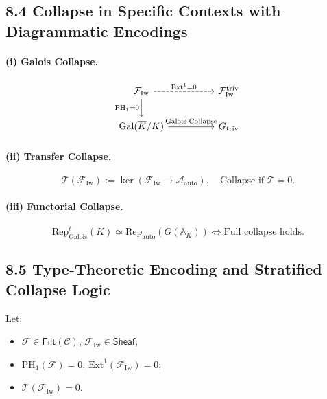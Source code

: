 \documentclass[11pt]{article}
\begin{document}
\subsection*{8.4 Collapse in Specific Contexts with Diagrammatic Encodings}

\paragraph{(i) Galois Collapse.}

\[
\begin{tikzcd}[column sep=huge]
\mathcal{F}_{\mathrm{Iw}} \arrow[r, dashed, "\mathrm{Ext}^1 = 0"] \arrow[d, "\mathrm{PH}_1 = 0"']
& \mathcal{F}_{\mathrm{Iw}}^{\mathrm{triv}} \\
\mathrm{Gal}(\overline{K}/K) \arrow[r, "\text{Galois Collapse}"]
& G_{\mathrm{triv}}
\end{tikzcd}
\]

\paragraph{(ii) Transfer Collapse.}

\[
\mathcal{T}(\mathcal{F}_{\mathrm{Iw}}) := \ker \left( \mathcal{F}_{\mathrm{Iw}} \to \mathcal{A}_{\mathrm{auto}} \right), \quad
\text{Collapse if } \mathcal{T} = 0.
\]

\paragraph{(iii) Functorial Collapse.}

\[
\mathrm{Rep}_{\mathrm{Galois}}^\ell(K) \simeq \mathrm{Rep}_{\mathrm{auto}}(G(\mathbb{A}_K)) \iff \text{Full collapse holds}.
\]

\subsection*{8.5 Type-Theoretic Encoding and Stratified Collapse Logic}

Let:

\begin{itemize}
    \item \( \mathcal{F} \in \mathsf{Filt}(\mathcal{C}) \), \( \mathcal{F}_{\mathrm{Iw}} \in \mathsf{Sheaf} \);
    \item \( \mathrm{PH}_1(\mathcal{F}) = 0 \), \( \mathrm{Ext}^1(\mathcal{F}_{\mathrm{Iw}}) = 0 \);
    \item \( \mathcal{T}(\mathcal{F}_{\mathrm{Iw}}) = 0 \).
\end{itemize}
\end{document}
